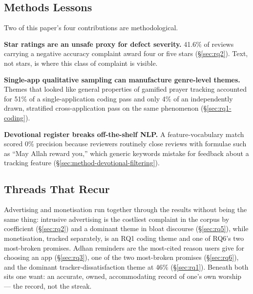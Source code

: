 \subsection{Methods Lessons}

Two of this paper's four contributions are methodological.

\textbf{Star ratings are an unsafe proxy for defect severity.} 41.6\% of
reviews carrying a negative accuracy complaint award four or five stars
(\S\ref{sec:rq2}). Text, not stars, is where this class of complaint is
visible.

\textbf{Single-app qualitative sampling can manufacture genre-level themes.}
Themes that looked like general properties of gamified prayer tracking
accounted for 51\% of a single-application coding pass and only 4\% of an
independently drawn, stratified cross-application pass on the same phenomenon
(\S\ref{sec:rq1-coding}).

\textbf{Devotional register breaks off-the-shelf NLP.} A feature-vocabulary
match scored 0\% precision because reviewers routinely close reviews with
formulae such as ``May Allah reward you,'' which generic keywords mistake for
feedback about a tracking feature (\S\ref{sec:method-devotional-filtering}).

\subsection{Threads That Recur}

Advertising and monetisation run together through the results without being
the same thing: intrusive advertising is the costliest complaint in the
corpus by coefficient (\S\ref{sec:rq2}) and a dominant theme in bloat
discourse (\S\ref{sec:rq5}), while monetisation, tracked separately, is an
RQ1 coding theme and one of RQ6's two most-broken promises. Adhan reminders
are the most-cited reason users give for choosing an app (\S\ref{sec:rq3}),
one of the two most-broken promises (\S\ref{sec:rq6}), and the dominant
tracker-dissatisfaction theme at 46\% (\S\ref{sec:rq1}). Beneath both sits one
want: an accurate, owned, accommodating record of one's own worship --- the
record, not the streak.
